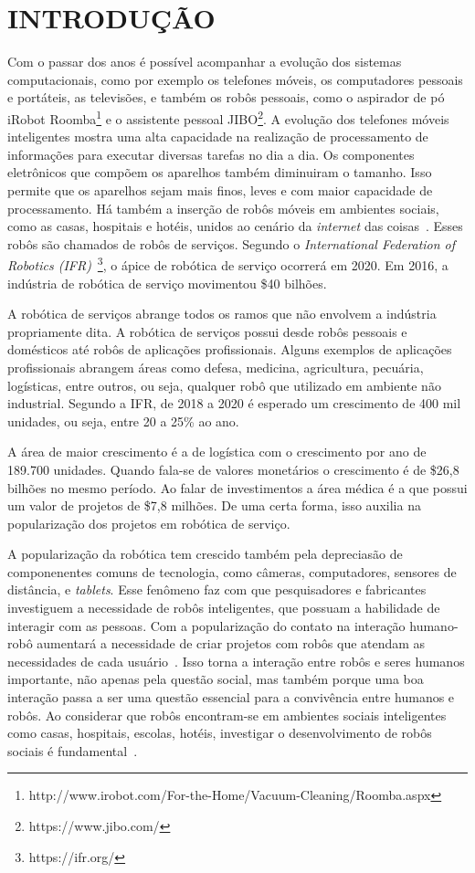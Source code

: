 \chapter{INTRODUÇÃO}
\label{cap:introducao}
Com o passar dos anos é possível acompanhar a evolução dos sistemas computacionais, como por exemplo os telefones móveis, os computadores pessoais e portáteis, as televisões, e também os robôs pessoais, como o aspirador de pó iRobot Roomba\footnote{http://www.irobot.com/For-the-Home/Vacuum-Cleaning/Roomba.aspx} e o assistente pessoal JIBO\footnote{https://www.jibo.com/}. A evolução dos telefones móveis inteligentes mostra uma alta capacidade na realização de processamento de informações para executar diversas tarefas no dia a dia. Os componentes eletrônicos que compõem os aparelhos também diminuiram o tamanho. Isso permite que os aparelhos sejam mais finos, leves e com maior capacidade de processamento. Há também a inserção de robôs móveis em ambientes sociais, como as casas, hospitais e hotéis, unidos ao cenário da \emph{internet} das coisas~\cite{heenan:2014}. Esses robôs são chamados de robôs de serviços. Segundo o \textit{International Federation of Robotics (IFR)}~\footnote{https://ifr.org/}, o ápice de robótica de serviço ocorrerá em 2020. Em 2016, a indústria de robótica de serviço movimentou \$40 bilhões.

A robótica de serviços abrange todos os ramos que não envolvem a indústria propriamente dita. A robótica de serviços possui desde robôs pessoais e domésticos até robôs de aplicações profissionais. Alguns exemplos de aplicações profissionais abrangem áreas como defesa, medicina, agricultura, pecuária, logísticas, entre outros, ou seja, qualquer robô que utilizado em ambiente não industrial. Segundo a IFR, de 2018 a 2020 é esperado um crescimento de 400 mil unidades, ou seja, entre 20 a 25\% ao ano.

A área de maior crescimento é a de logística com o crescimento por ano de 189.700 unidades. Quando fala-se de valores monetários o crescimento é de \$26,8 bilhões no mesmo período. Ao falar de investimentos a área médica é a que possui um valor de projetos de \$7,8 milhões. De uma certa forma, isso auxilia na popularização dos projetos em robótica de serviço.

A popularização da robótica tem crescido também pela depreciasão de componenentes comuns de tecnologia, como câmeras, computadores, sensores de distância, e \emph{tablets}. Esse fenômeno faz com que pesquisadores e fabricantes investiguem a necessidade de robôs inteligentes, que possuam a habilidade de interagir com as pessoas. Com a popularização do contato na interação humano-robô aumentará a necessidade de criar projetos com robôs que atendam as necessidades de cada usuário~\cite{looi:2012}. Isso torna a interação entre robôs e seres humanos importante, não apenas pela questão social, mas também porque uma boa interação passa a ser uma questão essencial para a convivência entre humanos e robôs. Ao considerar que robôs encontram-se em ambientes sociais inteligentes como casas, hospitais, escolas, hotéis, investigar o desenvolvimento de robôs sociais é fundamental~\cite{albo-canals:2013, brown:2013}.

